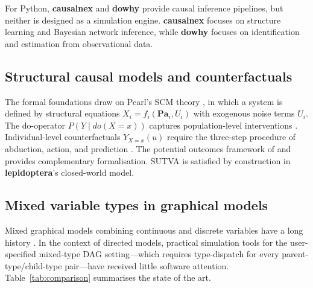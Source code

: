 \documentclass[12pt,a4paper]{article}
\newcommand{\pkg}[1]{\textbf{#1}}
\begin{document}
For Python, \pkg{causalnex} \citep{beaumont2021causalnex} and \pkg{dowhy} \citep{sharma2020dowhy} provide causal inference pipelines, but neither is designed as a simulation engine. \pkg{causalnex} focuses on structure learning and Bayesian network inference, while \pkg{dowhy} focuses on identification and estimation from observational data.

\subsection{Structural causal models and counterfactuals}

The formal foundations draw on Pearl's SCM theory \citep{pearl2009causality}, in which a system is defined by structural equations $X_i = f_i(\mathbf{Pa}_i, U_i)$ with exogenous noise terms $U_i$. The do-operator $P(Y \mid do(X=x))$ captures population-level interventions \citep{pearl1995causal}. Individual-level counterfactuals $Y_{X=x}(u)$ require the three-step procedure of abduction, action, and prediction \citep{pearl2009causality}. The potential outcomes framework of \citet{rubin1974estimating} and \citet{neyman1923} provides complementary formalisation. SUTVA \citep{rubin1980randomization} is satisfied by construction in \pkg{lepidoptera}'s closed-world model.

\subsection{Mixed variable types in graphical models}

Mixed graphical models combining continuous and discrete variables have a long history \citep{lauritzen1989graphical}. In the context of directed models, practical simulation tools for the user-specified mixed-type DAG setting---which requires type-dispatch for every parent-type/child-type pair---have received little software attention. Table~\ref{tab:comparison} summarises the state of the art.
\end{document}
